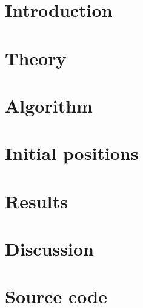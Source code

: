 \documentclass[a4paper, 12pt, english]{article}
\author{Kristoffer Brækken, Vedad Hodzic, Paul Magnus Sørensen-Clark}
\begin{document}
\begin{titlepage}
    \thispagestyle{empty}
    
\end{titlepage}

\section{Introduction}

\section{Theory}



\section{Algorithm}






\section{Initial positions}



\section{Results}



\section{Discussion}

\section{Source code}


\end{document}
